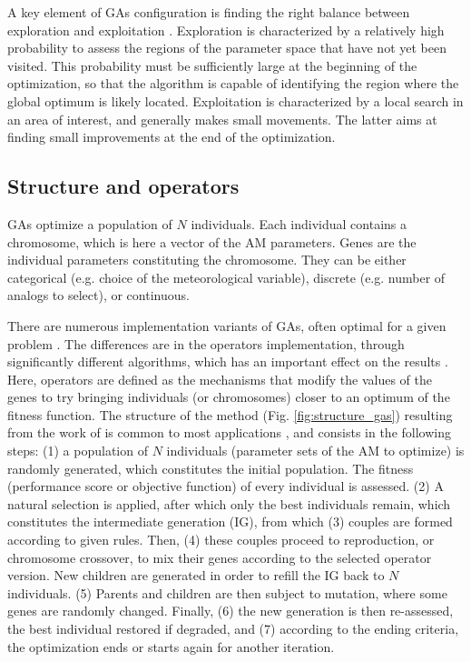 \documentclass{ametsoc}
\begin{document}
A key element of GAs configuration is finding the right balance between exploration and exploitation \citep{Back1992a, Smith1997a}. Exploration is characterized by a relatively high probability to assess the regions of the parameter space that have not yet been visited. This probability must be sufficiently large at the beginning of the optimization, so that the algorithm is capable of identifying the region where the global optimum is likely located. Exploitation is characterized by a local search in an area of interest, and generally makes small movements. The latter aims at finding small improvements at the end of the optimization.


\subsection{Structure and operators}
\label{sec:gas:operators}

GAs optimize a population of $N$ individuals. Each individual contains a chromosome, which is here a vector of the AM parameters. Genes are the individual parameters constituting the chromosome. They can be either categorical (e.g. choice of the meteorological variable), discrete (e.g. number of analogs to select), or continuous.

There are numerous implementation variants of GAs, often optimal for a given problem \citep{Hart1991a, Schraudolph1992a}. The differences are in the operators implementation, through significantly different algorithms, which has an important effect on the results \citep{Gaffney2010a}. Here, operators are defined as the mechanisms that modify the values of the genes to try bringing individuals (or chromosomes) closer to an optimum of the fitness function. The structure of the method (Fig. \ref{fig:structure_gas}) resulting from the work of \citet{Holland1992b} is common to most applications \citep{Back1993b}, and consists in the following steps: (1) a population of $N$ individuals (parameter sets of the AM to optimize) is randomly generated, which constitutes the initial population. The fitness (performance score or objective function) of every individual is assessed. (2) A natural selection is applied, after which only the best individuals remain, which constitutes the intermediate generation (IG), from which (3) couples are formed according to given rules. Then, (4) these couples proceed to reproduction, or chromosome crossover, to mix their genes according to the selected operator version. New children are generated in order to refill the IG back to $N$ individuals. (5) Parents and children are then subject to mutation, where some genes are randomly changed. Finally, (6) the new generation is then re-assessed, the best individual restored if degraded, and (7) according to the ending criteria, the optimization ends or starts again for another iteration.
\end{document}

